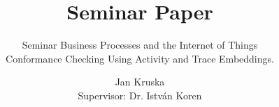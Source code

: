\documentclass[runningheads]{template/llncs}
\begin{document}
%
\title{Seminar Paper}
\subtitle{Seminar Business Processes and the Internet of Things \\ Conformance Checking Using Activity and Trace Embeddings.}
%
%
\author{Jan Kruska \\ Supervisor: Dr. István Koren}
%
%
%
\maketitle              %
%
%
%
%
\end{document}
